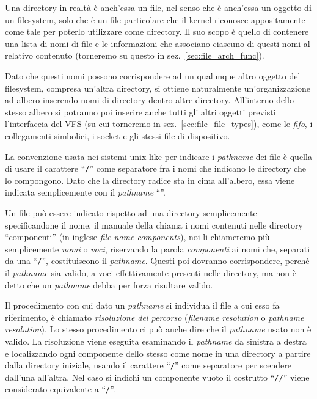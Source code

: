 Una directory in realtà è anch'essa un file, nel senso che è anch'essa un
oggetto di un filesystem, solo che è un file particolare che il kernel
riconosce appositamente come tale per poterlo utilizzare come directory. Il
suo scopo è quello di contenere una lista di nomi di file e le informazioni
che associano ciascuno di questi nomi al relativo contenuto (torneremo su
questo in sez.~\ref{sec:file_arch_func}).

Dato che questi nomi possono corrispondere ad un qualunque altro oggetto del
filesystem, compresa un'altra directory, si ottiene naturalmente
un'organizzazione ad albero inserendo nomi di directory dentro altre
directory.  All'interno dello stesso albero si potranno poi inserire anche
tutti gli altri oggetti previsti l'interfaccia del VFS (su cui torneremo in
sez.~\ref{sec:file_file_types}), come le \textit{fifo}, i collegamenti
simbolici, i socket e gli stessi file di dispositivo.

La convenzione usata nei sistemi unix-like per indicare i \textit{pathname}
dei file è quella di usare il carattere ``\texttt{/}'' come separatore fra i
nomi che indicano le directory che lo compongono. Dato che la directory radice
sta in cima all'albero, essa viene indicata semplicemente con il
\textit{pathname} ``\file{/}''.


Un file può essere indicato rispetto ad una directory semplicemente
specificandone il nome, il manuale della  chiama i nomi contenuti
nelle directory ``componenti'' (in inglese \textit{file name components}), noi
li chiameremo più semplicemente \textsl{nomi} o \textsl{voci}, riservando la
parola \textsl{componenti} ai nomi che, separati da una ``\texttt{/}'',
costituiscono il \textit{pathname}. Questi poi dovranno corrispondere, perché
il \textit{pathname} sia valido, a voci effettivamente presenti nelle
directory, ma non è detto che un \textit{pathname} debba per forza risultare
valido.  

Il procedimento con cui dato un \textit{pathname} si individua il file a cui
esso fa riferimento, è chiamato \textsl{risoluzione del percorso}
(\textit{filename resolution} o \textit{pathname resolution}). Lo stesso
procedimento ci può anche dire che il \textit{pathname} usato non è valido.
La risoluzione viene eseguita esaminando il \textit{pathname} da sinistra a
destra e localizzando ogni componente dello stesso come nome in una directory
a partire dalla directory iniziale, usando il carattere ``\texttt{/}'' come
separatore per scendere dall'una all'altra. Nel caso si indichi un componente
vuoto il costrutto ``\texttt{//}'' viene considerato equivalente a
``\texttt{/}''.

